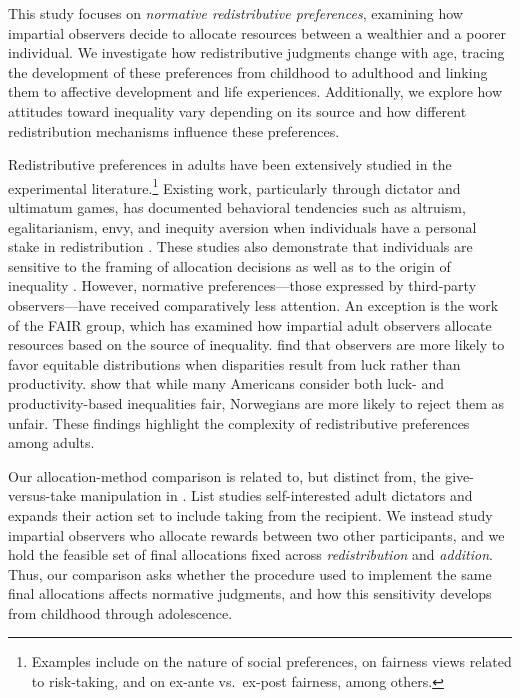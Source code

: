 \documentclass[11pt]{article}
\begin{document}
This study focuses on \emph{normative redistributive preferences}, examining how impartial observers decide to allocate resources between a wealthier and a poorer individual. We investigate how redistributive judgments change with age, tracing the development of these preferences from childhood to adulthood and linking them to affective development and life experiences. Additionally, we explore how attitudes toward inequality vary depending on its source and how different redistribution mechanisms influence these preferences.

Redistributive preferences in adults have been extensively studied in the experimental literature.\footnote{Examples include \citet{charness2002understanding} on the nature of social preferences, \citet{cappelen2013just} on fairness views related to risk-taking, and \citet{andreoni2020fair} on ex-ante vs.\ ex-post fairness, among others.} Existing work, particularly through dictator and ultimatum games, has documented behavioral tendencies such as altruism, egalitarianism, envy, and inequity aversion when individuals have a personal stake in redistribution \citep{engel2011dictator, oosterbeek2004cultural, fehr2006economics}. These studies also demonstrate that individuals are sensitive to the framing of allocation decisions \citep{list2007interpretation} as well as to the origin of inequality \citep{fong2001social, konow2000fair}. However, normative preferences---those expressed by third-party observers---have received comparatively less attention. An exception is the work of the FAIR group, which has examined how impartial adult observers allocate resources based on the source of inequality. \citet{cappelen2019meritocratic} find that observers are more likely to favor equitable distributions when disparities result from luck rather than productivity. \citet{almaas2020cutthroat} show that while many Americans consider both luck- and productivity-based inequalities fair, Norwegians are more likely to reject them as unfair. These findings highlight the complexity of redistributive preferences among adults.

Our allocation-method comparison is related to, but distinct from, the give-versus-take manipulation in \citet{list2007interpretation}. List studies self-interested adult dictators and expands their action set to include taking from the recipient. We instead study impartial observers who allocate rewards between two other participants, and we hold the feasible set of final allocations fixed across \emph{redistribution} and \emph{addition}. Thus, our comparison asks whether the procedure used to implement the same final allocations affects normative judgments, and how this sensitivity develops from childhood through adolescence.
\end{document}

